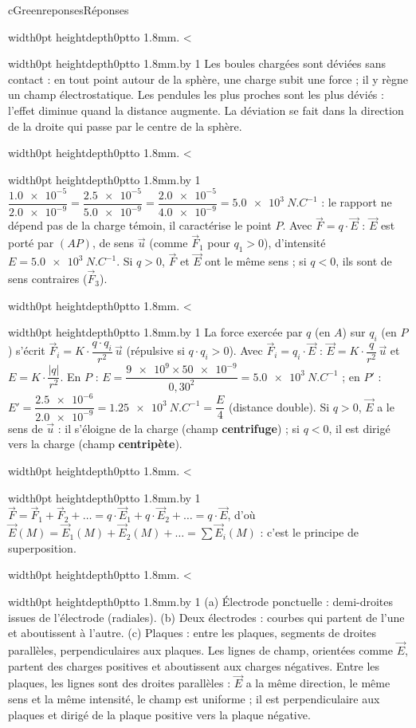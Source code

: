 \documentclass[11pt,a4paper]{article}
\newcommand{\vect}[1]{\overrightarrow{#1}}
\newif\ifeleve
\newlength{\interligne}\setlength{\interligne}{7mm}
\newlength{\replen}
\newcommand{\pointilles}{{\color{cInk2!60}\leaders\hbox to 1.8mm{\hss.\hss}\hfill}\kern0pt}
\newcommand{\lignes}[1]{\leavevmode\vrule width0pt height\dimexpr\interligne-1mm\relax depth0pt\pointilles
  \lgn=1 \loop\ifnum\lgn<#1 \par\nointerlineskip\noindent\vrule width0pt height\interligne depth0pt\pointilles\advance\lgn by 1 \repeat}
\newcommand{\rep}[1]{%
  \ifeleve
    \sbox{\repbox}{\parbox{\linewidth}{#1}}%
    \replen=\dimexpr\ht\repbox+\dp\repbox\relax
    \repn=\numexpr\replen/\baselineskip+1\relax
    \ifnum\repn<2 \repn=2\fi
    \edef\nblignes{\the\repn}\lignes{\nblignes}%
  \else #1\fi}
\newcommand{\titrereponses}{\ifeleve Mes réponses\else Réponses\fi}
\begin{document}
\begin{rub}{cGreen}{reponses}{\titrereponses}
\begin{reps}
  \item \rep{Les boules chargées sont déviées sans contact : en tout point autour de la sphère, une charge subit une force ; il y règne un champ électrostatique. Les pendules les plus proches sont les plus déviés : l’effet diminue quand la distance augmente. La déviation se fait dans la direction de la droite qui passe par le centre de la sphère.}
  \item \rep{$\dfrac{\num{1,0e-5}}{\num{2,0e-9}} = \dfrac{\num{2,5e-5}}{\num{5,0e-9}} = \dfrac{\num{2,0e-5}}{\num{4,0e-9}} = \qty{5,0e3}{N.C^{-1}}$ : le rapport ne dépend pas de la charge témoin, il caractérise le point $P$. Avec $\vect{F} = q\cdot\vect{E}$ : $\vect{E}$ est porté par $(AP)$, de sens $\vect{u}$ (comme $\vect{F}_1$ pour $q_1 > 0$), d’intensité $E = \qty{5,0e3}{N.C^{-1}}$. Si $q > 0$, $\vect{F}$ et $\vect{E}$ ont le même sens ; si $q < 0$, ils sont de sens contraires ($\vect{F}_3$).}
  \item \rep{La force exercée par $q$ (en $A$) sur $q_i$ (en $P$) s’écrit $\vect{F}_i = K\cdot\dfrac{q\cdot q_i}{r^2}\,\vect{u}$ (répulsive si $q\cdot q_i > 0$). Avec $\vect{F}_i = q_i\cdot\vect{E}$ : $\vect{E} = K\cdot\dfrac{q}{r^2}\,\vect{u}$ et $E = K\cdot\dfrac{|q|}{r^2}$. En $P$ : $E = \dfrac{\num{9e9}\times\num{50e-9}}{0{,}30^2} = \qty{5,0e3}{N.C^{-1}}$ ; en $P'$ : $E' = \dfrac{\num{2,5e-6}}{\num{2,0e-9}} = \qty{1,25e3}{N.C^{-1}} = \dfrac{E}{4}$ (distance double). Si $q > 0$, $\vect{E}$ a le sens de $\vect{u}$ : il s’éloigne de la charge (champ \textbf{centrifuge}) ; si $q < 0$, il est dirigé vers la charge (champ \textbf{centripète}).}
  \item \rep{$\vect{F} = \vect{F}_1 + \vect{F}_2 + \dots = q\cdot\vect{E}_1 + q\cdot\vect{E}_2 + \dots = q\cdot\vect{E}$, d’où $\vect{E}(M) = \vect{E}_1(M) + \vect{E}_2(M) + \dots = \sum\vect{E}_i(M)$ : c’est le principe de superposition.}
  \item \rep{(a) Électrode ponctuelle : demi-droites issues de l’électrode (radiales). (b) Deux électrodes : courbes qui partent de l’une et aboutissent à l’autre. (c) Plaques : entre les plaques, segments de droites parallèles, perpendiculaires aux plaques. Les lignes de champ, orientées comme $\vect{E}$, partent des charges positives et aboutissent aux charges négatives. Entre les plaques, les lignes sont des droites parallèles : $\vect{E}$ a la même direction, le même sens et la même intensité, le champ est uniforme ; il est perpendiculaire aux plaques et dirigé de la plaque positive vers la plaque négative.}
\end{reps}
\end{rub}
\end{document}
